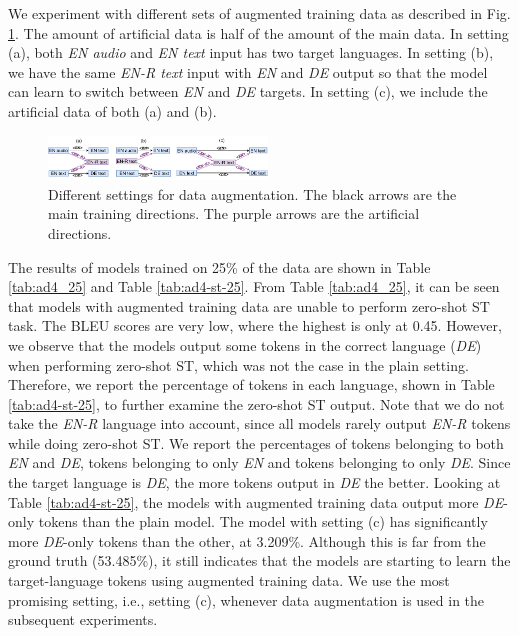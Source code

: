 \documentclass[conference]{IEEEtran}
\begin{document}
	We experiment with different sets of augmented training data as described in Fig. \ref{fig:EnDeAd}. The amount of artificial data is half of the amount of the main data. In setting (a), both \textit{EN audio} and \textit{EN text} input has two target languages. In setting (b), we have the same \textit{EN-R text} input with \textit{EN} and \textit{DE} output so that the model can learn to switch between \textit{EN} and \textit{DE} targets. In setting (c), we include the artificial data of both (a) and (b). 
	
	\begin{figure}[htbp]
		\centerline{\includegraphics[width=0.52\textwidth]{charts/EnDeAd.pdf}}
		\caption{Different settings for data augmentation. The black arrows are the main training directions. The purple arrows are the artificial directions.}
		\label{fig:EnDeAd}
	\end{figure}
	
	The results of models trained on 25\% of the data are shown in Table \ref{tab:ad4_25} and Table \ref{tab:ad4-st-25}. From Table \ref{tab:ad4_25}, it can be seen that models with augmented training data are unable to perform zero-shot ST task. The BLEU scores are very low, where the highest is only at 0.45. However, we observe that the models output some tokens in the correct language (\textit{DE}) when performing zero-shot ST, which was not the case in the plain setting. Therefore, we report the percentage of tokens in each language, shown in Table \ref{tab:ad4-st-25}, to further examine the zero-shot ST output. Note that we do not take the \textit{EN-R} language into account, since all models rarely output \textit{EN-R} tokens while doing zero-shot ST. We report the percentages of tokens belonging to both \textit{EN} and \textit{DE}, tokens belonging to only \textit{EN} and tokens belonging to only \textit{DE}. Since the target language is \textit{DE}, the more tokens output in \textit{DE} the better. Looking at Table \ref{tab:ad4-st-25}, the models with augmented training data output more \textit{DE}-only tokens than the plain model. The model with setting (c) has significantly more \textit{DE}-only tokens than the other, at 3.209\%. Although this is far from the ground truth (53.485\%), it still indicates that the models are starting to learn the target-language tokens using augmented training data. We use the most promising setting, i.e., setting (c), whenever data augmentation is used in the subsequent experiments.
	
\end{document}
